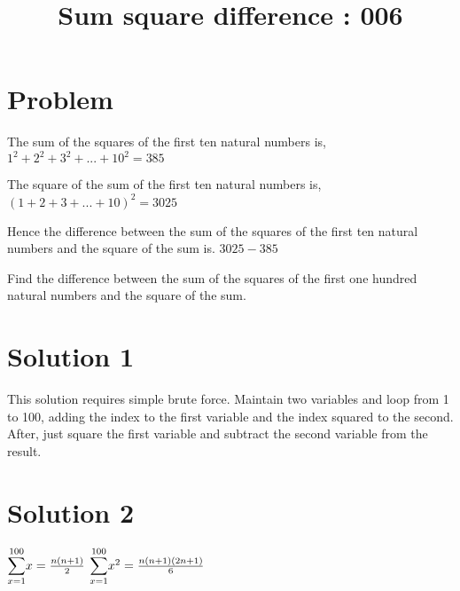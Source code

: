 \documentclass{article}
\title{Sum square difference : 006}
\begin{document}
\date{}
\maketitle



\section*{Problem}

The sum of the squares of the first ten natural numbers is,
\newline \hspace*{3mm} ${1^2 + 2^2 + 3^2 + ... + 10^2 = 385}$

The square of the sum of the first ten natural numbers is,
\newline \hspace*{3mm} ${(1 + 2 + 3 + ... + 10)^2 = 3025}$

Hence the difference between the sum of the squares of the first ten natural numbers and the square of the sum is.
\newline \hspace*{3mm} ${3025 - 385}$

Find the difference between the sum of the squares of the first one hundred natural numbers and the square of the sum.



\section*{Solution 1}
This solution requires simple brute force. Maintain two variables and loop from 1 to 100, adding the index to the first variable and the index squared to the second. After, just square the first variable and subtract the second variable from the result.

\section*{Solution 2}
\hspace*{3mm} $\mathlarger{\sum}_{x=1}^{100} x = \frac{n(n+1)}{2}$
\newline \hspace*{3mm} $\mathlarger{\sum}_{x=1}^{100} x^2 = \frac{n(n+1)(2n+1)}{6}$
\end{document}
